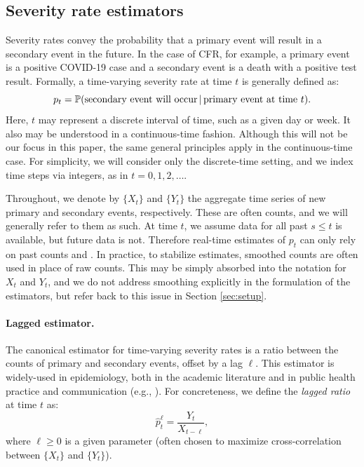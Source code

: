 \documentclass{article}
\renewcommand{\hat}{\widehat} %
\newcommand{\given}{\, \vert \,}
\begin{document}
\subsection{Severity rate estimators}
\label{sec:defs}

Severity rates convey the probability that a primary event will result in a
secondary event in the future. In the case of CFR, for example, a primary event
is a positive COVID-19 case and a secondary event is a death with a positive
test result. Formally, a time-varying severity rate at time $t$ is generally
defined as:  
\begin{equation}
\label{eq:severity}
p_t = \P(\text{secondary event will occur} \given \text{primary event at time 
  $t$}).   
\end{equation}
Here, $t$ may represent a discrete interval of time, such as a given day or 
week. It also may be understood in a continuous-time fashion. Although this will    
not be our focus in this paper, the same general principles apply in the
continuous-time case. For simplicity, we will consider only the discrete-time 
setting, and we index time steps via integers, as in $t=0,1,2,\dots$.    

Throughout, we denote by $\{X_t\}$ and $\{Y_t\}$ the aggregate time series of 
new primary and secondary events, respectively. These are often counts, and we
will generally refer to them as such. At time $t$, we assume data for all past
$s \leq t$ is available, but future data is not. Therefore real-time estimates of
$p_t$ can only rely on past counts  and
. In practice, to stabilize estimates, smoothed
counts are often used in place of raw counts. This may be simply absorbed into 
the notation for $X_t$ and $Y_t$, and we do not address smoothing explicitly in
the formulation of the estimators, but refer back to this issue in Section
\ref{sec:setup}.  

\paragraph{Lagged estimator.} 

The canonical estimator for time-varying severity rates is a ratio between
the counts of primary and secondary events, offset by a lag $\ell$. This
estimator is widely-used in epidemiology, both in the academic literature and in 
public health practice and communication (e.g., \citealp{wsj, atlantic,
  yuan2020monitoring, timevar_ifr, thomas2021estimating, horita2022global,
  LIU2023100350, germany}). For concreteness, we define the \emph{lagged ratio} 
at time $t$ as:   
\begin{equation}
\label{eq:lagged}
\hat{p}_t^\ell = \frac{Y_t}{X_{t-\ell}},
\end{equation}
where $\ell \geq 0$ is a given parameter (often chosen to maximize
cross-correlation between $\{X_t\}$ and $\{Y_t\}$).      
\end{document}
